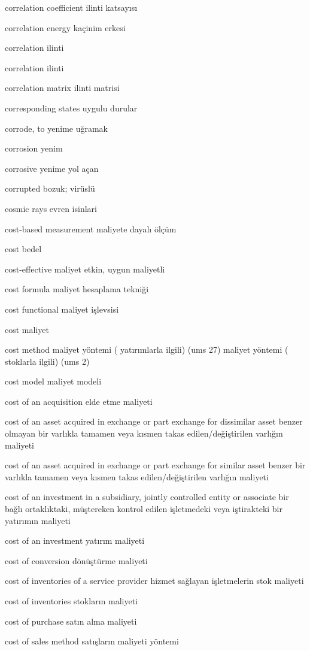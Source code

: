 \documentclass[12pt,fleqn]{article}\usepackage{../../common}
\begin{document}
correlation coefficient ilinti katsayısı

correlation energy kaçinim erkesi

correlation ilinti

correlation ilinti

correlation matrix ilinti matrisi

corresponding states uygulu durular

corrode, to yenime uğramak

corrosion yenim

corrosive yenime yol açan

corrupted bozuk; virüslü

cosmic rays evren isinlari

cost-based measurement maliyete dayalı ölçüm

cost bedel

cost-effective maliyet etkin, uygun maliyetli

cost formula maliyet hesaplama tekniği

cost functional maliyet işlevsisi

cost maliyet

cost method maliyet yöntemi ( yatırımlarla ilgili) (ums 27) maliyet yöntemi ( stoklarla ilgili) (ums 2)

cost model maliyet modeli

cost of an acquisition elde etme maliyeti

cost of an asset acquired in exchange or part exchange for dissimilar asset benzer olmayan bir varlıkla tamamen veya kısmen takas edilen/değiştirilen varlığın maliyeti

cost of an asset acquired in exchange or part exchange for similar asset benzer bir varlıkla tamamen veya kısmen takas edilen/değiştirilen varlığın maliyeti

cost of an investment in a subsidiary, jointly controlled entity or associate bir bağlı ortaklıktaki, müştereken kontrol edilen işletmedeki veya iştirakteki bir yatırımın maliyeti

cost of an investment yatırım maliyeti

cost of conversion dönüştürme maliyeti

cost of inventories of a service provider hizmet sağlayan işletmelerin stok maliyeti

cost of inventories stokların maliyeti

cost of purchase satın alma maliyeti

cost of sales method satışların maliyeti yöntemi
\end{document}
